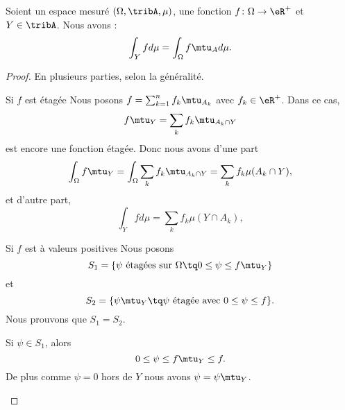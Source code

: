 \begin{lemma}       \label{LEMooSPOFooBxDEAV}
    Soient un espace mesuré \( (\Omega,\tribA,\mu)\), une fonction \( f\colon \Omega\to \eR^+\) et \( Y\in\tribA\). Nous avons :
    \begin{equation}        \label{EQooSBDKooPTDEcr}
        \int_Yfd\mu=\int_{\Omega}f\mtu_Ad\mu.
    \end{equation}
\end{lemma}

\begin{proof}
    En plusieurs parties, selon la généralité.
    \begin{subproof}
        \item[Si \( f\) est étagée]
            Nous posons \( f=\sum_{k=1}^nf_k\mtu_{A_k}\) avec \( f_k\in \eR^+\). Dans ce cas,
            \begin{equation}
                f\mtu_Y=\sum_kf_k\mtu_{A_k\cap Y}
            \end{equation}
            est encore une fonction étagée. Donc nous avons d'une part
            \begin{equation}
                \int_{\Omega}f\mtu_Y=\int_{\Omega}\sum_kf_k\mtu_{A_k\cap Y}=\sum_kf_k\mu(A_k\cap Y),
            \end{equation}
            et d'autre part,
            \begin{equation}
                \int_Yfd\mu=\sum_kf_k\mu(Y\cap A_k),
            \end{equation}
        \item[Si \( f\) est à valeurs positives]
            Nous posons
            \begin{equation}
                S_1=\{ \psi\text{ étagées sur } \Omega\tq 0\leq \psi\leq  f\mtu_{Y} \}
            \end{equation}
            et
            \begin{equation}
                S_2=\{ \psi\mtu_Y\tq \psi\text{ étagée avec } 0\leq\psi\leq f \}.
            \end{equation}
            Nous prouvons que \( S_1=S_2\). 
            
            Si \( \psi\in S_1\), alors
            \begin{equation}
                0\leq \psi\leq f\mtu_Y\leq f.
            \end{equation}
            De plus comme \( \psi=0\) hors de \( Y\) nous avons \( \psi=\psi\mtu_Y\).


\end{subproof}
\end{proof}
